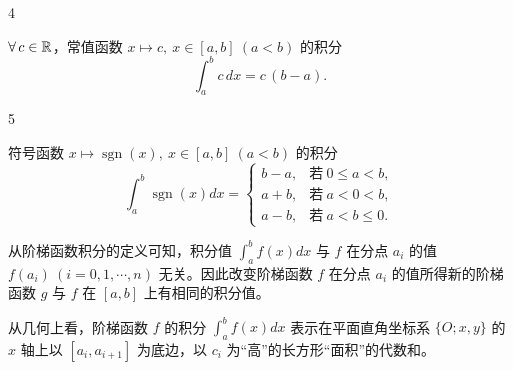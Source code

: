 \begin{sourceexample}{4}

	\(\forall\,c\in\mathbb{R}\)，常值函数 \(x\longmapsto c,\ x\in[a,b]\ (a<b)\) 的积分
	\[
	\int_a^b c\,dx=c\,(b-a).
	\]

\end{sourceexample}

\begin{sourceexample}{5}

	符号函数 \(x\longmapsto\operatorname{sgn}(x),\ x\in[a,b]\ (a<b)\) 的积分
	\[
	\int_a^b\operatorname{sgn}(x)dx=
	\begin{cases}
	b-a, & \text{若}\ 0\le a<b, \\
	a+b, & \text{若}\ a<0<b, \\
	a-b, & \text{若}\ a<b\le0.
	\end{cases}
	\]

\end{sourceexample}

从阶梯函数积分的定义可知，积分值 \(\displaystyle\int_a^b f(x)dx\) 与 \(f\) 在分点 \(a_i\) 的值 \(f(a_i)\ (i=0,1,\cdots,n)\) 无关。因此改变阶梯函数 \(f\) 在分点 \(a_i\) 的值所得新的阶梯函数 \(g\) 与 \(f\) 在 \([a,b]\) 上有相同的积分值。

从几何上看，阶梯函数 \(f\) 的积分 \(\displaystyle\int_a^b f(x)dx\) 表示在平面直角坐标系 \(\{O;x,y\}\) 的 \(x\) 轴上以 \([a_i,a_{i+1}]\) 为底边，以 \(c_i\) 为“高”的长方形“面积”的代数和。

